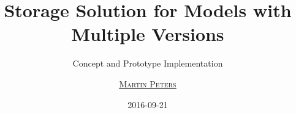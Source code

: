 \usepackage[utf8]{inputenc}
\usepackage{pifont}
\usepackage{arev}

\author[
	\textbf{\href{http://www.sbi.uni-rostock.de/team/single/martin-peters/}{Martin Peters}}
]
{
	\underline{\textsc{\href{http://freakybytes.net}{Martin Peters}}}
}

\date{2016-09-21}



\titlegraphic{
}
\title[Storage Solution for Models with Multiple Versions]{\Large Storage Solution for Models with Multiple Versions}
\subtitle{\small Concept and Prototype Implementation}


\titleimage{}
\renewcommand{\mylogo}{
}

